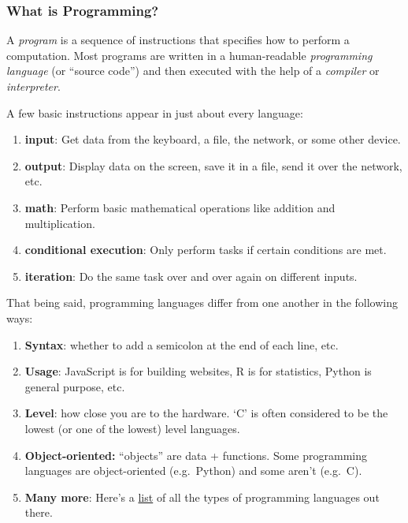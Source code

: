 \documentclass[]{book}
\providecommand{\tightlist}{%
  \setlength{\itemsep}{0pt}\setlength{\parskip}{0pt}}
\begin{document}
\hypertarget{what-is-programming}{%
\subsubsection*{What is Programming?}\label{what-is-programming}}

A \emph{program} is a sequence of instructions that specifies how to perform a computation. Most programs are written in a human-readable \emph{programming language} (or ``source code'') and then executed with the help of a \emph{compiler} or \emph{interpreter}.

A few basic instructions appear in just about every language:

\begin{enumerate}
\def\labelenumi{\arabic{enumi}.}
\tightlist
\item
  \textbf{input}: Get data from the keyboard, a file, the network, or some other device.
\item
  \textbf{output}: Display data on the screen, save it in a file, send it over the network, etc.
\item
  \textbf{math}: Perform basic mathematical operations like addition and multiplication.
\item
  \textbf{conditional execution}: Only perform tasks if certain conditions are met.
\item
  \textbf{iteration}: Do the same task over and over again on different inputs.
\end{enumerate}

That being said, programming languages differ from one another in the following ways:

\begin{enumerate}
\def\labelenumi{\arabic{enumi}.}
\tightlist
\item
  \textbf{Syntax}: whether to add a semicolon at the end of each line, etc.
\item
  \textbf{Usage}: JavaScript is for building websites, R is for statistics, Python is general purpose, etc.
\item
  \textbf{Level}: how close you are to the hardware. `C' is often considered to be the lowest (or one of the lowest) level languages.
\item
  \textbf{Object-oriented:} ``objects'' are data + functions. Some programming languages are object-oriented (e.g.~Python) and some aren't (e.g.~C).
\item
  \textbf{Many more}: Here's a \href{https://en.wikipedia.org/wiki/List_of_programming_languages_by_type}{list} of all the types of programming languages out there.
\end{enumerate}
\end{document}
